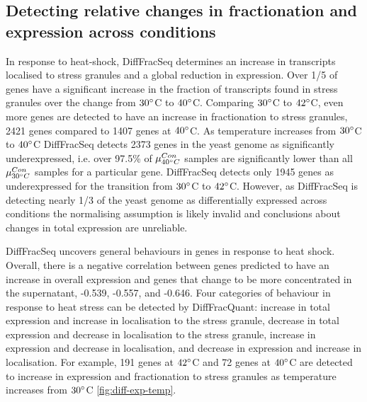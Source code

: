\documentclass[../main.tex]{subfiles}
\begin{document}
\subsection{Detecting relative changes in fractionation and expression across conditions}

In response to heat-shock, DiffFracSeq determines an increase in transcripts localised to stress granules and a global reduction in expression.
Over 1/5 of genes have a significant increase in the fraction of transcripts found in stress granules over the change from $30\degree$C to $40\degree$C.
Comparing $30\degree$C to $42\degree$C, even more genes are detected to have an increase in fractionation to stress granules, 2421 genes compared to 1407 genes at $40\degree$C.
As temperature increases from $30\degree$C to $40\degree$C DiffFracSeq detects 2373 genes in the yeast genome as significantly underexpressed, i.e. over 97.5\% of $\mu^{Con}_{40\degree C}$ samples are significantly lower than all $\mu^{Con}_{30\degree C}$ samples for a particular gene.
DiffFracSeq detects only 1945 genes as underexpressed for the transition from $30\degree$C to $42\degree$C.
However, as DiffFracSeq is detecting nearly 1/3 of the yeast genome as differentially expressed across conditions the normalising assumption is likely invalid and conclusions about changes in total expression are unreliable.

DiffFracSeq uncovers general behaviours in genes in response to heat shock.
Overall, there is a negative correlation between genes predicted to have an increase in overall expression and genes that change to be more concentrated in the supernatant, {-0.539}, -0.557, and -0.646.
Four categories of behaviour in response to heat stress can be detected by DiffFracQuant: increase in total expression and increase in localisation to the stress granule, decrease in total expression and decrease in localisation to the stress granule, increase in expression and decrease in localisation, and decrease in expression and increase in localisation.
For example, 191 genes at $42\degree$C  and 72 genes at $40\degree$C  are detected to increase in expression and  fractionation to stress granules as temperature increases from $30\degree$C \ref{fig:diff-exp-temp}.
\end{document}
